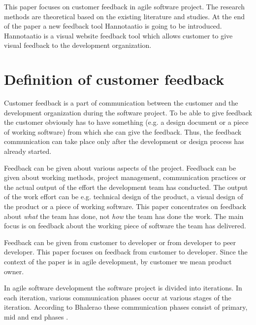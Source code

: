 \documentclass[conference]{IEEEtran}
\begin{document}
This paper focuses on customer feedback in agile software project. The research methods are theoretical based on the existing literature and studies. At the end of the paper a new feedback tool Hannotaatio is going to be introduced. Hannotaatio is a visual website feedback tool which allows customer to give visual feedback to the development organization.



\section{Definition of customer feedback}


Customer feedback is a part of communication between the customer and the development organization during the software project. To be able to give feedback the customer obviously has to have something (e.g. a design document or a piece of working software) from which she can give the feedback. Thus, the feedback communication can take place only after the development or design process has already started.

Feedback can be given about various aspects of the project. Feedback can be given about working methods, project management, communication practices or the actual output of the effort the development team has conducted. The output of the work effort can be e.g. technical design of the product, a visual design of the product or a piece of working software. This paper concentrates on feedback about \textit{what} the team has done, not \textit{how} the team has done the work. The main focus is on feedback about the working piece of software the team has delivered.

Feedback can be given from customer to developer or from developer to peer developer. This paper focuses on feedback from customer to developer. Since the context of the paper is in agile development, by customer we mean product owner.

In agile software development the software project is divided into iterations. In each iteration, various communication phases occur at various stages of the iteration. According to Bhalerao these communication phases consist of primary, mid and end phases \cite{2010bhalerao}.
\end{document}
